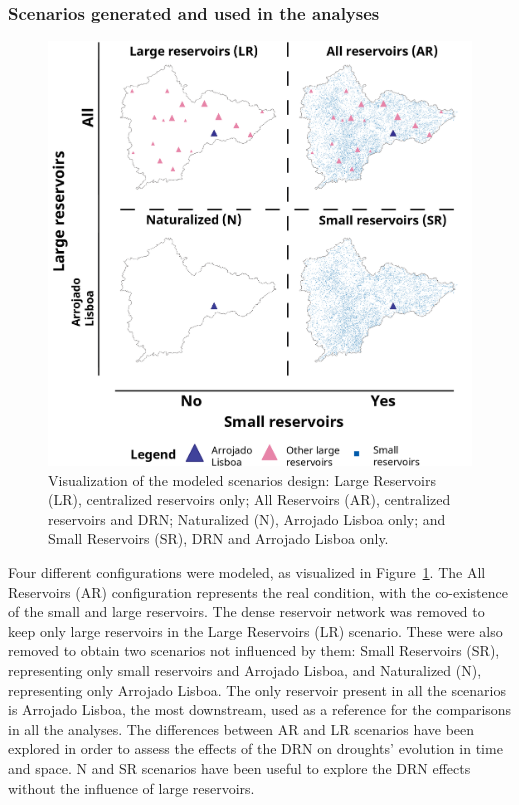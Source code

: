 \documentclass[draft]{agujournal2019}
\begin{document}
\subsubsection{Scenarios generated and used in the analyses}\label{sec:scenarios}

\begin{figure}
 \noindent\includegraphics[width=\textwidth]{images/Figure_2.png}
 \caption{Visualization of the modeled scenarios design: Large Reservoirs (LR), centralized reservoirs only; All Reservoirs (AR), centralized reservoirs and DRN; Naturalized (N), Arrojado Lisboa only; and Small Reservoirs (SR), DRN and Arrojado Lisboa only.}
 \label{fig2}
\end{figure}

Four different configurations were modeled, as visualized in Figure~\ref{fig2}. The All Reservoirs (AR) configuration represents the real condition, with the co-existence of the small and large reservoirs. The dense reservoir network was removed to keep only large reservoirs in the Large Reservoirs (LR) scenario. These were also removed to obtain two scenarios not influenced by them: Small Reservoirs (SR), representing only small reservoirs and Arrojado Lisboa, and Naturalized (N), representing only Arrojado Lisboa. The only reservoir present in all the scenarios is Arrojado Lisboa, the most downstream, used as a reference for the comparisons in all the analyses. The differences between AR and LR scenarios have been explored in order to assess the effects of the DRN on droughts’ evolution in time and space. N and SR scenarios have been useful to explore the DRN effects without the influence of large reservoirs.
\end{document}
